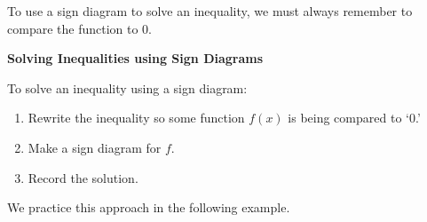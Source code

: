 \medskip

To use a sign diagram to solve an inequality, we must always remember to compare the function to $0$.

\medskip

\colorbox{ResultColor}{\bbm

\centerline{\textbf{Solving Inequalities using Sign Diagrams}} 

\smallskip

To solve an inequality using a sign diagram:

\begin{enumerate}

\item  Rewrite the inequality so some function $f(x)$ is being compared to `$0$.'

\item  Make a sign diagram for $f$.

\item  Record the solution.

\end{enumerate}

\ebm}

\medskip

We practice this approach in the following example.

